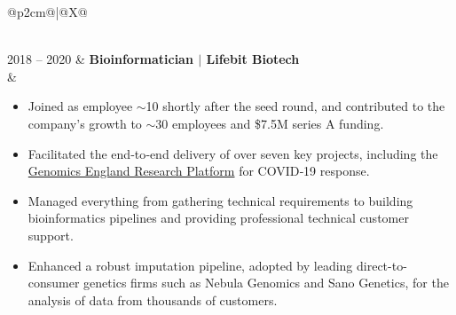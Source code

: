 \documentclass[letterpaper,11pt]{article}
\begin{document}
\begin{tabularx}{\linewidth}{@{}p{2cm}@{\hspace{5pt}}|@{\hspace{5pt}}X@{}}
\begin{minipage}[t]{\linewidth}
  \end{minipage} \\
  2018 -- 2020 & 
  \textbf{Bioinformatician $|$ Lifebit Biotech} \\
  & \begin{minipage}[t]{\linewidth}
      \begin{itemize}[noitemsep]
          \item Joined as employee $\sim$10 shortly after the seed round, and contributed to the company's growth to $\sim$30 employees and \$7.5M series A funding.
          \item Facilitated the end‐to‐end delivery of over seven key projects, including the \href{https://www.genomicsengland.co.uk/news/research-environment-covid-19-lifebit-aws}{\color{teal}Genomics England Research Platform} for COVID‐19 response.
          \item Managed everything from gathering technical requirements to building bioinformatics pipelines and providing professional technical customer support.
          \item Enhanced a robust imputation pipeline, adopted by leading direct-to-consumer genetics firms such as Nebula Genomics and Sano Genetics, for the analysis of data from thousands of customers.
      \end{itemize}
  \end{minipage}
\end{tabularx}



\end{document}
